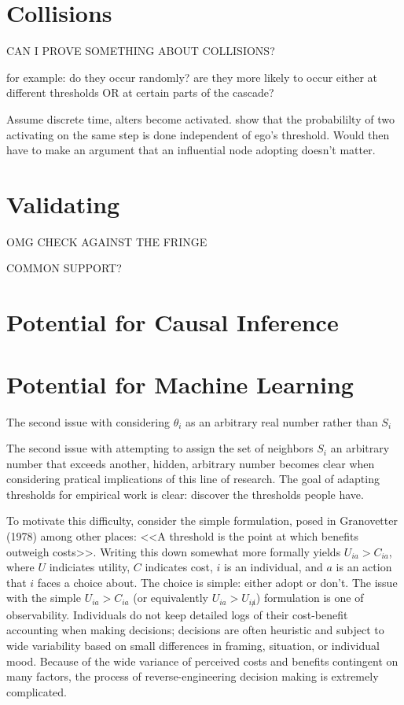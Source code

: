 \documentclass{article}
\begin{document}
\section{Collisions}

CAN I PROVE SOMETHING ABOUT COLLISIONS?

for example: do they occur randomly? are they more likely to occur either at different thresholds OR at certain parts of the cascade?

Assume discrete time, alters become activated. show that the probabililty of two activating on the same step is done independent of ego's threshold. Would then have to make an argument that an influential node adopting doesn't matter. 

\section{Validating}

OMG CHECK AGAINST THE FRINGE

COMMON SUPPORT?

\section{Potential for Causal Inference}

\section{Potential for Machine Learning}


The second issue with considering $\theta_i$ as an arbitrary real number rather than $S_i$ 

The second issue with attempting to assign the set of neighbors $S_i$ an arbitrary number that exceeds another, hidden, arbitrary number becomes clear when considering pratical implications of this line of research. The goal of adapting thresholds for empirical work is clear: discover the thresholds people have.







To motivate this difficulty, consider the simple formulation, posed in Granovetter (1978) among other places: <<A threshold is the point at which benefits outweigh costs>>. Writing this down somewhat more formally yields $U_{ia} > C_{ia}$, where $U$ indiciates utility, $C$ indicates cost, $i$ is an individual, and $a$ is an action that $i$ faces a choice about. The choice is simple: either adopt or don't. The issue with the simple $U_{ia} > C_{ia}$ (or equivalently $U_{ia} > U_{i\not a}$) formulation is one of observability. Individuals do not keep detailed logs of their cost-benefit accounting when making decisions; decisions are often heuristic and subject to wide variability based on small differences in framing, situation, or individual mood. Because of the wide variance of perceived costs and benefits contingent on many factors, the process of reverse-engineering decision making is extremely complicated.
\end{document}
